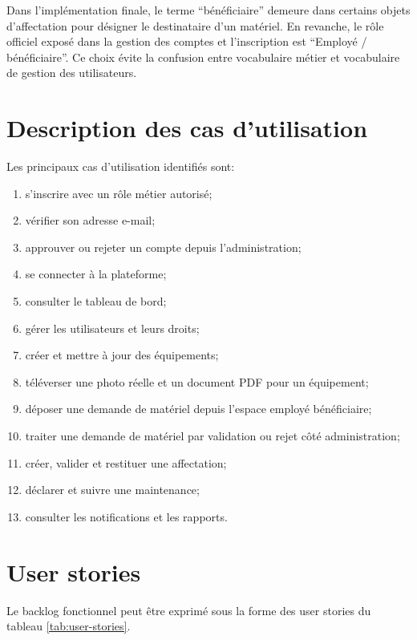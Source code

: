 ﻿\documentclass[12pt,a4paper,oneside]{report}
\begin{document}
Dans l'implémentation finale, le terme \enquote{bénéficiaire} demeure dans certains objets d'affectation pour désigner le destinataire d'un matériel. En revanche, le rôle officiel exposé dans la gestion des comptes et l'inscription est \enquote{Employé / bénéficiaire}. Ce choix évite la confusion entre vocabulaire métier et vocabulaire de gestion des utilisateurs.

\section{Description des cas d'utilisation}
Les principaux cas d'utilisation identifiés sont:
\begin{enumerate}
  \item s'inscrire avec un rôle métier autorisé;
  \item vérifier son adresse e-mail;
  \item approuver ou rejeter un compte depuis l'administration;
  \item se connecter à la plateforme;
  \item consulter le tableau de bord;
  \item gérer les utilisateurs et leurs droits;
  \item créer et mettre à jour des équipements;
  \item téléverser une photo réelle et un document PDF pour un équipement;
  \item déposer une demande de matériel depuis l'espace employé bénéficiaire;
  \item traiter une demande de matériel par validation ou rejet côté administration;
  \item créer, valider et restituer une affectation;
  \item déclarer et suivre une maintenance;
  \item consulter les notifications et les rapports.
\end{enumerate}

\section{User stories}
Le backlog fonctionnel peut être exprimé sous la forme des user stories du tableau \ref{tab:user-stories}.
\end{document}

